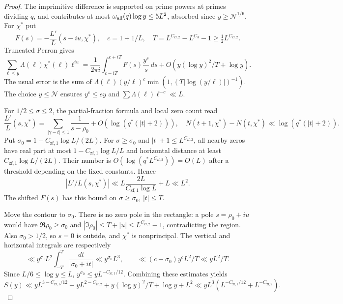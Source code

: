 \documentclass[11pt]{article}
\theoremstyle{definition}
\newcommand{\GN}{\mathcal N}
\theoremstyle{remark}
\numberwithin{equation}{section}
\begin{document}
\begin{proof}
The imprimitive difference is supported on prime powers at primes
dividing $q$, and contributes at most
$\omega_{\rm all}(q)\log y\le5L^2$, absorbed since
$y\ge\GN^{1/6}$.
For $\chi^*$ put
\begin{equation}\label{eq:Perron-data}
 F(s)=-\frac{L'}{L}(s-iu,\chi^*),\quad
 c=1+1/L,\quad
 T=L^{C_{\mathrm{zf},2}}-L^{C_3}-1\ge\tfrac12L^{C_{\mathrm{zf},2}}.
\end{equation}
Truncated Perron \cite[Chapter~17]{Davenport} gives
\begin{equation}\label{eq:Perron}
 \sum_{\ell\le y}\Lambda(\ell)\chi^*(\ell)\ell^{iu}
 =\frac1{2\pi i}\int_{c-iT}^{c+iT}F(s)\frac{y^s}{s}\,ds
       +O(y(\log y)^2/T+\log y).
\end{equation}
The usual error is the sum of
$\Lambda(\ell)(y/\ell)^c
\min(1,(T|\log(y/\ell)|)^{-1})$.
The choice $y\le\GN$ ensures $y^c\le ey$ and
$\sum\Lambda(\ell)\ell^{-c}\ll L$.

For $1/2\le\sigma\le2$, the partial-fraction formula and local
zero count \cite[Chapter~16]{Davenport} read
\begin{equation}\label{eq:partial-fraction}
 \frac{L'}L(s,\chi^*)
 =\sum_{|\gamma-t|\le1}\frac1{s-\rho_0}
       +O(\log(q^*(|t|+2))),\quad
 N(t+1,\chi^*)-N(t,\chi^*)\ll\log(q^*(|t|+2)).
\end{equation}
Put $\sigma_0=1-C_{\mathrm{zf},1}\log L/(2L)$.
For $\sigma\ge\sigma_0$ and $|t|+1\le L^{C_{\mathrm{zf},2}}$,
all nearby zeros have real part at most
$1-C_{\mathrm{zf},1}\log L/L$ and horizontal distance at least
$C_{\mathrm{zf},1}\log L/(2L)$.
Their number is $O(\log(q^*L^{C_{\mathrm{zf},2}}))=O(L)$ after a
threshold depending on the fixed constants. Hence
\begin{equation}\label{eq:log-derivative}
 |L'/L(s,\chi^*)|\ll
 L\frac{2L}{C_{\mathrm{zf},1}\log L}+L\ll L^2.
\end{equation}
The shifted $F(s)$ has this bound on $\sigma\ge\sigma_0$, $|t|\le T$.

Move the contour to $\sigma_0$.
There is no zero pole in the rectangle: a pole $s=\rho_0+iu$ would
have $\Re\rho_0\ge\sigma_0$ and
$|\Im\rho_0|\le T+|u|\le L^{C_{\mathrm{zf},2}}-1$, contradicting
the region. Also $\sigma_0>1/2$, so $s=0$ is outside, and
$\chi^*$ is nonprincipal. The vertical and horizontal integrals
are respectively
\[
 \ll y^{\sigma_0}L^2\int_{-T}^T\frac{dt}{|\sigma_0+it|}
 \ll y^{\sigma_0}L^3,
 \qquad
 \ll(c-\sigma_0)y^cL^2/T\ll yL^2/T.
\]
Since $L/6\le\log y\le L$,
$y^{\sigma_0}\le yL^{-C_{\mathrm{zf},1}/12}$.
Combining these estimates yields
\begin{equation}\label{eq:P-end}
 S(y)\ll yL^{3-C_{\mathrm{zf},1}/12}+yL^{2-C_{\mathrm{zf},2}}
       +y(\log y)^2/T+\log y+L^2
 \ll yL^3(L^{-C_{\mathrm{zf},1}/12}+L^{-C_{\mathrm{zf},2}}).
\end{equation}
\end{proof}
\end{document}
